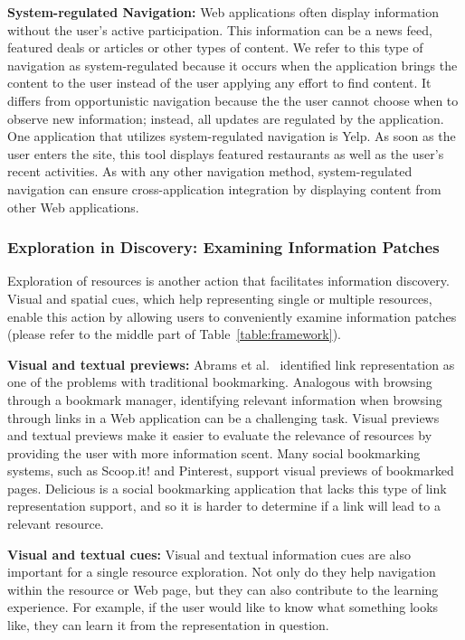 \documentclass{sigchi}
\newcommand{\feature}[1]{{\ttfamily#1}}
\begin{document}
{\textbf{System-regulated Navigation:}
Web applications often display information without the user's active participation. This information can be a \feature{news feed}, \feature{featured} deals or articles or other types of content. We refer to this type of navigation as system-regulated because it occurs when the application brings the content to the user instead of the user applying any effort to find content. It differs from opportunistic navigation because the the user cannot choose when to observe new information; instead, all updates are regulated by the application. 
%
One application that utilizes system-regulated navigation is Yelp. As soon as the user enters the site, this tool displays featured restaurants as well as the user's recent activities. As with any other navigation method, system-regulated navigation can ensure cross-application \feature{integration} by displaying content from other Web applications. 


{\subsubsection{Exploration in Discovery: Examining Information Patches}
Exploration of resources is another action that facilitates information discovery. Visual and spatial cues, which help representing single or multiple resources, enable this action by allowing users to conveniently examine information patches (please refer to the middle part of Table~\ref{table:framework}). 

\textbf{Visual and textual previews:} Abrams et al.~\cite{abrams1998information} identified link representation as one of the problems with traditional bookmarking. Analogous with browsing through a bookmark manager, identifying relevant information when browsing through links in a Web application can be a challenging task. \feature{Visual previews} and \feature{textual previews} make it easier to evaluate the relevance of resources by providing the user with more information scent. Many social bookmarking systems, such as Scoop.it! and Pinterest, support visual previews of bookmarked pages. Delicious is a social bookmarking application that lacks this type of link representation support, and so it is harder to determine if a link will lead to a relevant resource.

\textbf{Visual and textual cues:} \feature{Visual and textual information cues} are also important for a single resource exploration. Not only do they help navigation within the resource or Web page, but they can also contribute to the learning experience. For example, if the user would like to know what something looks like, they can learn it from the representation in question.  

}}
\end{document}
